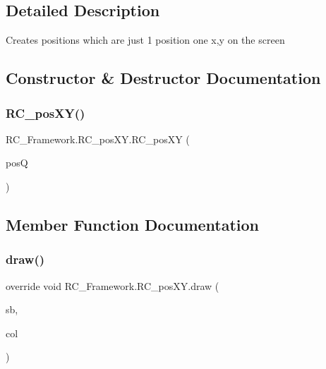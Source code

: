 \subsection{Detailed Description}
Creates positions which are just 1 position one x,y on the screen 



\subsection{Constructor \& Destructor Documentation}
\mbox{\label{class_r_c___framework_1_1_r_c__pos_x_y_a27e517ab746a80cfaef66091813ad3ab}} 
\subsubsection{\texorpdfstring{R\+C\+\_\+pos\+X\+Y()}{RC\_posXY()}}
{\footnotesize\ttfamily R\+C\+\_\+\+Framework.\+R\+C\+\_\+pos\+X\+Y.\+R\+C\+\_\+pos\+XY (\begin{DoxyParamCaption}\item[{Vector2}]{posQ }\end{DoxyParamCaption})}



\subsection{Member Function Documentation}
\mbox{\label{class_r_c___framework_1_1_r_c__pos_x_y_aaf344770b6a98b98937f4d43ffd536ef}} 
\subsubsection{\texorpdfstring{draw()}{draw()}}
{\footnotesize\ttfamily override void R\+C\+\_\+\+Framework.\+R\+C\+\_\+pos\+X\+Y.\+draw (\begin{DoxyParamCaption}\item[{Sprite\+Batch}]{sb,  }\item[{Color}]{col }\end{DoxyParamCaption})\hspace{0.3cm}{\ttfamily [virtual]}}



